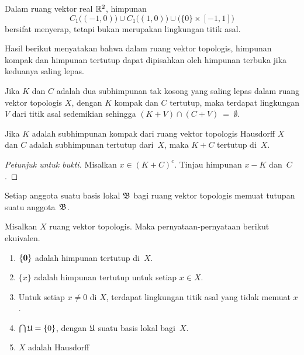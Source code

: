 \begin{exam} Dalam ruang vektor real $\mathbb{R}^2$, himpunan
    \[ C_1\bigl((-1,0)\bigr) \cup C_1\bigl((1,0)\bigr) \cup \bigl(\{0\} \times [-1,1]\bigr) \]
bersifat menyerap, tetapi bukan merupakan lingkungan titik asal.
\end{exam}

Hasil berikut menyatakan bahwa dalam ruang vektor topologis, himpunan kompak dan himpunan tertutup dapat dipisahkan oleh himpunan terbuka jika keduanya saling lepas.

\begin{prop} Jika $K$ dan $C$ adalah dua subhimpunan tak kosong yang saling lepas dalam ruang vektor topologis $X$, dengan $K$ kompak dan $C$ tertutup, maka terdapat
lingkungan $V$ dari titik asal sedemikian sehingga $(K + V) \cap (C + V)~=~\emptyset$.
\end{prop}

\begin{cor} Jika $K$ adalah subhimpunan kompak dari ruang vektor topologis Hausdorff $X$ dan $C$ adalah subhimpunan tertutup dari~$X$, maka $K + C$
tertutup di~$X$.
\end{cor}

\begin{proof}[\emph{Petunjuk untuk bukti}] Misalkan $x \in (K + C)^c$.  Tinjau himpunan $x - K$ dan~$C$.  \ns
\end{proof}

\begin{cor} Setiap anggota suatu basis lokal $\mathfrak{B}$ bagi ruang vektor topologis memuat tutupan suatu anggota~$\mathfrak{B}$.
\end{cor}

\begin{prop} Misalkan $X$ ruang vektor topologis.  Maka pernyataan-pernyataan berikut ekuivalen.
  \begin{enumerate}[label=\rm{(\alph*)}]
    \item $\{\mathbf{0}\}$ adalah himpunan tertutup di~$X$.
    \item $\{x\}$ adalah himpunan tertutup untuk setiap $x \in X$.
    \item Untuk setiap $x \ne 0$ di $X$, terdapat lingkungan titik asal yang tidak memuat $x$.
    \item $\bigcap \mathfrak{U} = \{0\}$, dengan $\mathfrak{U}$ suatu basis lokal bagi~$X$.
    \item $X$ adalah Hausdorff
  \end{enumerate}
\end{prop}

